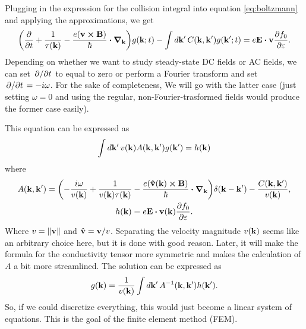 \documentclass[12pt]{article}
\begin{document}
Plugging in the expression for the collision integral into equation \eqref{eq:boltzmann} and
applying the approximations, we get
\begin{equation}
    \qty(\pdv{t} + \frac{1}{\tau(\vb{k})} - \frac{e(\vb{v}\cross\vb{B})}{\hbar}\vdot\grad_{\vb{k}})
    g(\vb{k}; t) - \int\dd{\vb{k'}} C(\vb{k}, \vb{k'}) g(\vb{k'}; t)
    = e\vb{E}\vdot\vb{v}\pdv{f_0}{\varepsilon}.
\end{equation}
Depending on whether we want to study steady-state DC fields or AC fields, we can set $\pdv*{t}$ to
equal to zero or perform a Fourier transform and set $\pdv*{t} = -i\omega$. For the sake of
completeness, We will go with the latter case (just setting $\omega=0$ and using the regular,
non-Fourier-trasformed fields would produce the former case easily).

This equation can be expressed as
\begin{equation}
    \int \dd{\vb{k'}} v(\vb{k}) A(\vb{k}, \vb{k'}) g(\vb{k'}) = h(\vb{k})
    \label{eq:integral_equation}
\end{equation}
where
\begin{gather}
    A(\vb{k}, \vb{k'}) = \qty(-\frac{i\omega}{v(\vb{k})} + \frac{1}{v(\vb{k})\tau(\vb{k})}
        - \frac{e\qty(\vu{v}(\vb{k})\cross\vb{B})}{\hbar}\vdot\grad_{\vb{k}})\delta(\vb{k}-\vb{k'})
        - \frac{C(\vb{k},\vb{k'})}{v(\vb{k})}, \label{eq:operator} \\
    h(\vb{k}) = e\vb{E}\vdot\vb{v}(\vb{k})\pdv{f_0}{\varepsilon}.
\end{gather}
Where $v=\norm{\vb{v}}$ and $\vu{v}=\vb{v}/v$. Separating the velocity magnitude $v(\vb{k})$
seems like an arbitrary choice here, but it is done with good reason. Later, it will make the
formula for the conductivity tensor more symmetric and makes the calculation of $A$ a bit more
streamlined. The solution can be expressed as
\begin{equation}
    g(\vb{k}) = \frac{1}{v(\vb{k})} \int\dd{\vb{k'}} A^{-1}(\vb{k}, \vb{k'}) h(\vb{k'}).
\end{equation}
So, if we could discretize everything, this would just become a linear system of equations. This is
the goal of the finite element method (FEM).
\end{document}
